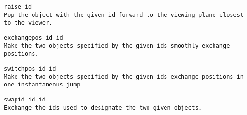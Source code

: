 \quest
\tt raise id\\
\hspace*{3ex} \rm  Pop the object with the given id forward to the
viewing plane closest to the viewer.

\quest
\tt exchangepos id id\\
\hspace*{3ex} \rm Make the two objects specified by the given ids
smoothly exchange positions.

\quest
\tt switchpos id id\\
\hspace*{3ex} \rm Make the two objects specified by the given ids
exchange positions in one instantaneous jump.

\quest
\tt swapid id id\\
\hspace*{3ex} \rm Exchange the ids used to designate the two given
objects. 


